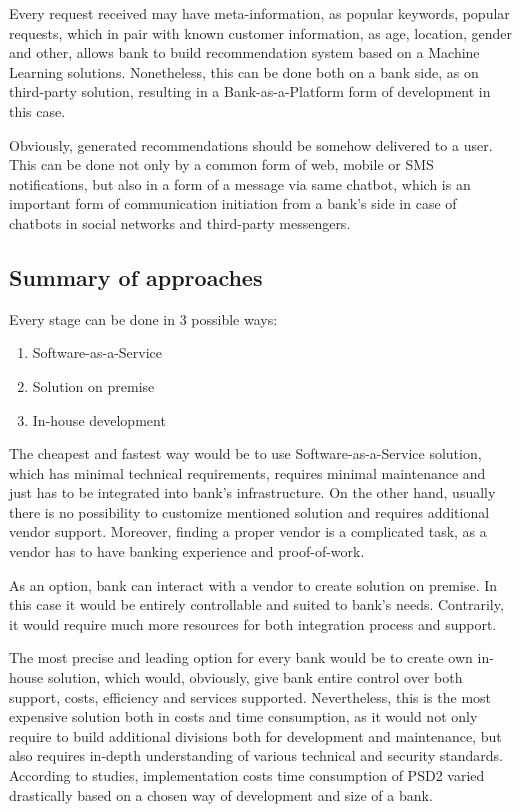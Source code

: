 Every request received may have meta-information, as popular keywords, popular requests, which in pair with known customer information, as age, location, gender and other, allows bank to build recommendation system based on a Machine Learning solutions.
Nonetheless, this can be done both on a bank side, as on third-party solution, resulting in a Bank-as-a-Platform form of development in this case.

Obviously, generated recommendations should be somehow delivered to a user.
This can be done not only by a common form of web, mobile or SMS notifications, but also in a form of a message via same chatbot, which is an important form of communication initiation from a bank's side in case of chatbots in social networks and third-party messengers.

\subsection{Summary of approaches}

Every stage can be done in 3 possible ways:
\begin{enumerate}
    \item Software-as-a-Service
    \item Solution on premise
    \item In-house development
\end{enumerate}

The cheapest and fastest way would be to use Software-as-a-Service solution, which has minimal technical requirements, requires minimal maintenance and just has to be integrated into bank's infrastructure. 
On the other hand, usually there is no possibility to customize mentioned solution and requires additional vendor support. 
Moreover, finding a proper vendor is a complicated task, as a vendor has to have banking experience and proof-of-work.

As an option, bank can interact with a vendor to create solution on premise. 
In this case it would be entirely controllable and suited to bank's needs. 
Contrarily, it would require much more resources for both integration process and support.

The most precise and leading option for every bank would be to create own in-house solution, which would, obviously, give bank entire control over both support, costs, efficiency and services supported.
Nevertheless, this is the most expensive solution both in costs and time consumption, as it would not only require to build additional divisions both for development and maintenance, but also requires in-depth understanding of various technical and security standards.
According to studies, implementation costs time consumption of PSD2 varied drastically based on a chosen way of development and size of a bank. 
\cite{saltedge_open_banking_report}
\cite{deloitte_psd2_costs}


